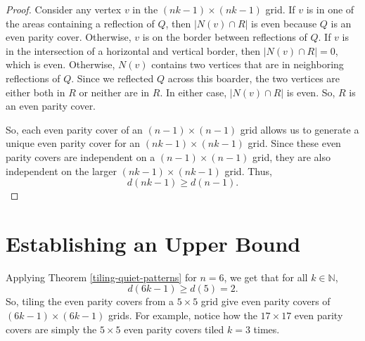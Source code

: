 \documentclass[a4paper]{article}
\newcommand{\N}{\mathbb{N}}
\newcommand{\abs}[1]{\left| #1 \right|}
\begin{document}
\begin{proof}
		Consider any vertex $v$ in the $(nk-1) \times (nk-1)$ grid.
		If $v$ is in one of the areas containing a reflection of $Q$, then $\abs{N(v) \cap R}$ is even because $Q$ is an even parity cover.
		Otherwise, $v$ is on the border between reflections of $Q$.
		If $v$ is in the intersection of a horizontal and vertical border, then $\abs{N(v) \cap R} = 0$, which is even.
		Otherwise, $N(v)$ contains two vertices that are in neighboring reflections of $Q$.
		Since we reflected $Q$ across this boarder, the two vertices are either both in $R$ or neither are in $R$.
		In either case, $\abs{N(v) \cap R}$ is even.
		So, $R$ is an even parity cover.
		
		So, each even parity cover of an $(n-1) \times (n-1)$ grid allows us to generate a unique even parity cover for an $(nk-1) \times (nk-1)$ grid.
		Since these even parity covers are independent on a $(n-1) \times (n-1)$ grid, they are also independent on the larger $(nk-1) \times (nk-1)$ grid.
		Thus,
		\begin{equation*}
			d(nk-1) \geq d(n-1).
		\end{equation*}
	\end{proof}

	\section{Establishing an Upper Bound}
	Applying Theorem \ref{tiling-quiet-patterns} for $n=6$, we get that for all $k \in \N$,
	\begin{equation*}
		d(6k - 1) \geq d(5) = 2.
	\end{equation*}
	So, tiling the even parity covers from a $5 \times 5$ grid give even parity covers of $(6k-1) \times (6k-1)$ grids.
	For example, notice how the $17 \times 17$ even parity covers are simply the $5 \times 5$ even parity covers tiled $k=3$ times.
	
\end{document}
